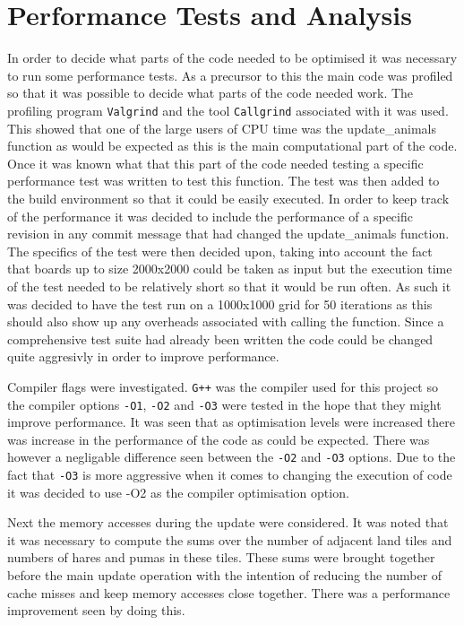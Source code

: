 \section{Performance Tests and Analysis}
In order to decide what parts of the code needed to be optimised it was necessary to run some performance tests.
As a precursor to this the main code was profiled so that it was possible to decide what parts of the code needed work.
The profiling program \texttt{Valgrind} and the tool \texttt{Callgrind} associated with it was used.
This showed that one of the large users of CPU time was the update\_animals function as would be expected as this is the main computational part of the code.
Once it was known what that this part of the code needed testing a specific performance test was written to test this function.
The test was then added to the build environment so that it could be easily executed.
In order to keep track of the performance it was decided to include the performance of a specific revision in any commit message that had changed the update\_animals function.
The specifics of the test were then decided upon, taking into account the fact that boards up to size 2000x2000 could be taken as input but the execution time of the test needed to be relatively short so that it would be run often.
As such it was decided to have the test run on a 1000x1000 grid for 50 iterations as this should also show up any overheads associated with calling the function.
Since a comprehensive test suite had already been written the code could be changed quite aggresivly in order to improve performance.

Compiler flags were investigated.
\texttt{G++} was the compiler used for this project so the compiler options \texttt{-O1}, \texttt{-O2} and \texttt{-O3} were tested in the hope that they might improve performance.
It was seen that as optimisation levels were increased there was increase in the performance of the code as could be expected.
There was however a negligable difference seen between the \texttt{-O2} and \texttt{-O3} options.
Due to the fact that \texttt{-O3} is more aggressive when it comes to changing the execution of code it was decided to use -O2 as the compiler optimisation option.

Next the memory accesses during the update were considered.
It was noted that it was necessary to compute the sums over the number of adjacent land tiles and numbers of hares and pumas in these tiles.
These sums were brought together before the main update operation with the intention of reducing the number of cache misses and keep memory accesses close together.
There was a performance improvement seen by doing this.

